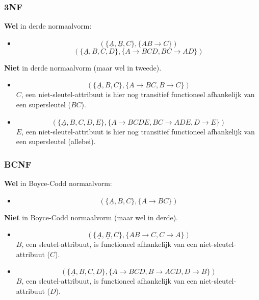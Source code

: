 \documentclass[normaalvormen.tex]{subfiles}
\begin{document}
\subsubsection*{3NF}
\textbf{Wel} in derde normaalvorm:
\begin{itemize}
\item
\[
(\{\underline{A}, \underline{B}, C\},\{AB\rightarrow C\})
\]
\[
(\{\underline{A}, B, C, D\},\{A\rightarrow BCD,BC\rightarrow AD\})
\]
\end{itemize}
\textbf{Niet} in derde normaalvorm (maar wel in tweede).
\begin{itemize}
\item
\[
(\{\underline{A},B,C\},\{A\rightarrow BC, B\rightarrow C\})
\]
$C$, een niet-sleutel-attribuut is hier nog transitief functioneel afhankelijk van een supersleutel ($BC$).
\item
\[
(\{\underline{A},B,C,D,E\},\{A\rightarrow BCDE, BC\rightarrow ADE, D\rightarrow E\})
\]
$E$, een niet-sleutel-attribuut is hier nog transitief functioneel afhankelijk van een supersleutel (allebei).
\end{itemize}

\subsubsection*{BCNF}
\textbf{Wel} in Boyce-Codd normaalvorm:
\begin{itemize}
\item 
\[
(\{\underline{A},B,C\},\{A\rightarrow BC\})
\]
\end{itemize}
\textbf{Niet} in Boyce-Codd normaalvorm (maar wel in derde).
\begin{itemize}
\item
\[
(\{\underline{A},\underline{B},C\},\{AB\rightarrow C, C\rightarrow A\})
\]
$B$, een sleutel-attribuut, is functioneel afhankelijk van een niet-sleutel-attribuut ($C$).
\item
\[
(\{\underline{A}, B, C, D\},\{A\rightarrow BCD,B\rightarrow ACD,D\rightarrow B\})
\]
$B$, een sleutel-attribuut, is functioneel afhankelijk van een niet-sleutel-attribuut ($D$).
\end{itemize}
\end{document}
